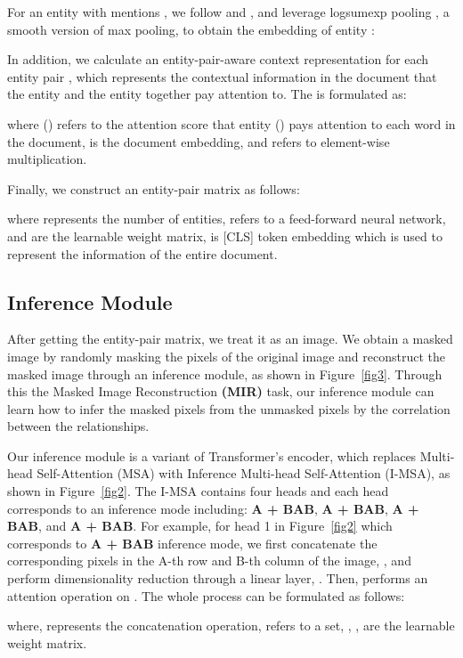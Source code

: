 \documentclass{article}
\begin{document}
For an entity  with mentions , we follow \cite{c:11} and \cite{c:13}, and leverage logsumexp pooling \cite{c:22}, a smooth version of max pooling, to obtain the embedding  of entity :

In addition, we calculate an entity-pair-aware context representation  for each entity pair , which represents the contextual information in the document that the entity  and the entity  together pay attention to.
The  is formulated as:

where () refers to the attention score that entity () pays attention to each word in the document,  is the document embedding, and  refers to element-wise multiplication.

Finally, we construct an entity-pair matrix  as follows:

where  represents the number of entities,  refers to a feed-forward neural network,  and  are the learnable weight matrix,  is [CLS] token embedding which is used to represent the information of the entire document.

\subsection{Inference Module}
\label{sec2.2}
After getting the entity-pair matrix, we treat it as an image.
We obtain a masked image by randomly masking the pixels of the original image and reconstruct the masked image through an inference module, as shown in Figure~\ref{fig3}.
Through this the Masked Image Reconstruction \textbf{(MIR)} task, our inference module can learn how to infer the masked pixels from the unmasked pixels by the correlation between the relationships.

Our inference module is a variant of Transformer's encoder, which replaces Multi-head Self-Attention (MSA) with Inference Multi-head Self-Attention (I-MSA), as shown in Figure~\ref{fig2}.
The I-MSA contains four heads and each head corresponds to an inference mode including: \textbf{A + BAB}, \textbf{A + BAB}, \textbf{A + BAB}, and  \textbf{A + BAB}. 
For example, for head 1 in Figure~\ref{fig2} which corresponds to \textbf{A + BAB} inference mode, we first concatenate the corresponding pixels in the A-th row and B-th column of the image, , and perform dimensionality reduction through a linear layer, .
Then,  performs an attention operation on .
The whole process can be formulated as follows:

where,  represents the concatenation operation,  refers to a set, , ,  are the learnable weight matrix.
\end{document}

